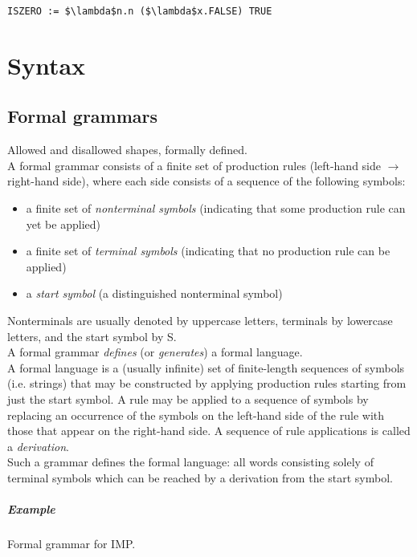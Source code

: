\documentclass[12pt,b5paper]{book}
\theoremstyle{definition}
\begin{document}
\begin{lstlisting}
ISZERO := $\lambda$n.n ($\lambda$x.FALSE) TRUE
\end{lstlisting}


\chapter{Syntax}

\section{Formal grammars}
Allowed and disallowed shapes, formally defined. \\

A formal grammar consists of a finite set of production rules (left-hand side $\rightarrow$ right-hand side), where each side consists of a sequence of the following symbols:
\begin{itemize}
\item a finite set of \textit{nonterminal symbols} (indicating that some production rule can yet be applied)
\item a finite set of \textit{terminal symbols} (indicating that no production rule can be applied)
\item a \textit{start symbol} (a distinguished nonterminal symbol)
\end{itemize}

Nonterminals are usually denoted by uppercase letters, terminals by lowercase letters, and the start symbol by S. \\

A formal grammar \textit{defines} (or \textit{generates}) a formal language. \\

A formal language is a (usually infinite) set of finite-length sequences of symbols (i.e. strings) that may be constructed by applying production rules starting from just the start symbol. A rule may be applied to a sequence of symbols by replacing an occurrence of the symbols on the left-hand side of the rule with those that appear on the right-hand side. A sequence of rule applications is called a \textit{derivation}. \\

Such a grammar defines the formal language: all words consisting solely of terminal symbols which can be reached by a derivation from the start symbol. \\

\paragraph{Example}
Formal grammar for IMP. \\
\end{document}
